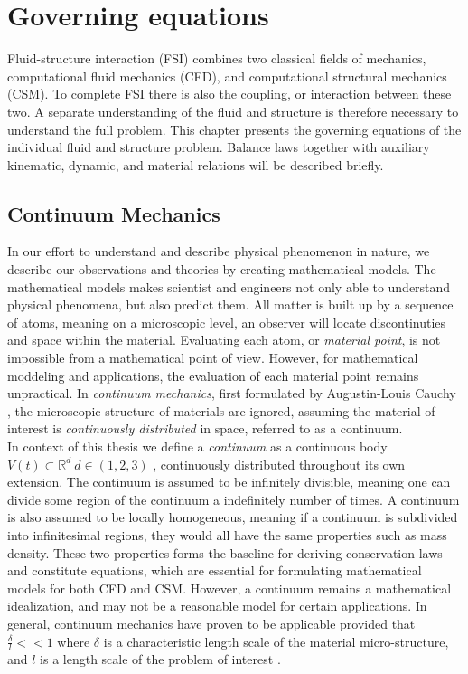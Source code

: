 \chapter{Governing equations}

Fluid-structure interaction (FSI) combines two classical fields of mechanics, computational fluid mechanics (CFD), and computational structural mechanics (CSM). To complete FSI there is also the coupling, or interaction between these two. A separate understanding of the fluid and structure is therefore necessary to understand the full problem. This chapter presents the governing equations of the individual fluid and structure problem. Balance laws together with auxiliary kinematic, dynamic, and material relations will be described briefly.

\section{Continuum Mechanics}
In our effort to understand and describe physical phenomenon in nature, we describe our observations and theories by creating mathematical models. The mathematical models makes scientist and engineers not only able to understand physical phenomena, but also predict them.  All matter is built up by a sequence of atoms, meaning on a microscopic level, an observer will locate discontinuties and space within the material. Evaluating each atom, or \textit{material point}, is not impossible from a mathematical point of view. However, for mathematical moddeling and applications, the evaluation of each material point remains unpractical. In \textit{continuum mechanics}, first formulated by Augustin-Louis Cauchy \cite{Merodio2011}, the microscopic structure of materials are ignored,  assuming the material of interest is \textit{continuously distributed} in space, referred to as a continuum. \\

In context of this thesis we define a \textit{continuum} as a continuous body $V(t) \subset \mathbb{R}^d \ d \in (1, 2, 3)$ ,  continuously distributed throughout its own extension. The continuum is assumed to be infinitely divisible, meaning one can divide some region of the continuum a indefinitely number of times. A continuum is also assumed to be locally homogeneous, meaning if a continuum is subdivided into infinitesimal regions, they would all have the same properties such as mass density. These two properties forms the baseline for deriving conservation laws and constitute equations, which are essential for formulating mathematical models for both CFD and CSM. However, a continuum remains a mathematical idealization, and may not be a reasonable model for certain applications. In general, continuum mechanics have proven to be applicable provided that $\frac{\delta}{l} << 1$ where $\delta$ is a characteristic length scale of the material micro-structure, and $l$ is a length scale of the problem of interest \cite{Humphrey2002}.

